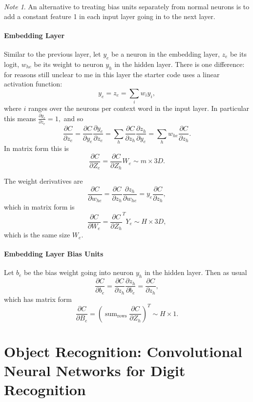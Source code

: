 \documentclass[12pt]{article}
\theoremstyle{plain}
\theoremstyle{definition}
\theoremstyle{remark}
\newtheorem{note}[theorem]{Note}
\DeclareMathOperator*{\sumtext}{sum}
\begin{document}
\begin{note}
An alternative to treating bias units separately from normal neurons is to add a constant feature 1 in each input layer going in to the next layer.
\end{note}

\subsection{Embedding Layer}

Similar to the previous layer, let $y_e$ be a neuron in the embedding layer, $z_e$ be its logit, $w_{he}$ be its weight to neuron $y_h$ in the hidden layer. There is one difference: for reasons still unclear to me in this layer the starter code uses a linear activation function: $$y_e = z_e = \sum_i w_i y_i,$$ where $i$ ranges over the neurons per context word in the input layer. In particular this means $\frac{\partial y_e}{\partial z_e} = 1,$ and so
$$\frac{\partial C}{\partial z_e} = \frac{\partial C}{\partial y_e} \frac{\partial y_e}{\partial z_e} = \sum_h \frac{\partial C}{\partial z_h} \frac{\partial z_h}{\partial y_e} = \sum_h w_{he} \frac{\partial C}{\partial z_h}.$$
In matrix form this is
$$\frac{\partial C}{\partial Z_e} = \frac{\partial C}{\partial Z_h} W_e \sim m \times 3D.$$

The weight derivatives are
$$\frac{\partial C}{\partial w_{he}} = \frac{\partial C}{\partial z_h} \frac{\partial z_h}{\partial w_{he}} = y_e \frac{\partial C}{\partial z_h},$$
which in matrix form is
$$\frac{\partial C}{\partial W_e} = \frac{\partial C}{\partial Z_h}^T Y_e \sim H \times 3D,$$
which is the same size $W_e.$

\subsection{Embedding Layer Bias Units}

Let $b_e$ be the bias weight going into neuron $y_h$ in the hidden layer. Then as usual
$$\frac{\partial C}{\partial b_e} = \frac{\partial C}{\partial z_h} \frac{\partial z_h}{\partial b_e} = \frac{\partial C}{\partial z_h},$$
which has matrix form
$$\frac{\partial C}{\partial B_e} = \left(\sumtext_{\text{rows}} \frac{\partial C}{\partial Z_h}\right)^T \sim H \times 1.$$

\part{Object Recognition: Convolutional Neural Networks for Digit Recognition}
\end{document}
